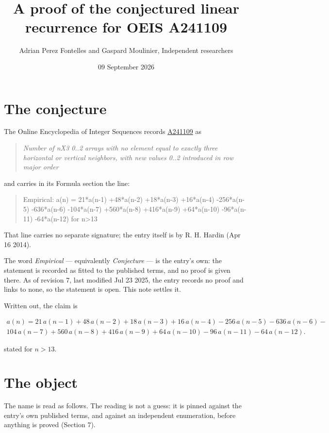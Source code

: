 \documentclass[11pt]{article}
\title{A proof of the conjectured linear recurrence for OEIS A241109}
\author{Adrian Perez Fontelles and Gaspard Moulinier, Independent researchers}
\date{09 September 2026}
\theoremstyle{definition}
\begin{document}
\maketitle
\section{The conjecture}

The Online Encyclopedia of Integer Sequences records \href{https://oeis.org/A241109}{A241109} as

\begin{quote}\itshape Number of nX3 0..2 arrays with no element equal to exactly three horizontal or vertical neighbors, with new values 0..2 introduced in row major order\end{quote}

and carries in its Formula section the line:

\begin{quote}\ttfamily Empirical: a(n) = 21*a(n-1) +48*a(n-2) +18*a(n-3) +16*a(n-4) -256*a(n-5) -636*a(n-6) -104*a(n-7) +560*a(n-8) +416*a(n-9) +64*a(n-10) -96*a(n-11) -64*a(n-12) for n>13\end{quote}

That line carries no separate signature; the entry itself is by R. H. Hardin (Apr 16 2014).

The word {\itshape Empirical} --- equivalently {\itshape Conjecture} --- is the entry's own: the statement is recorded as fitted to the published terms, and no proof is given there. As of revision 7, last modified Jul 23 2025, the entry records no proof and links to none, so the statement is open. This note settles it.

Written out, the claim is

\begin{multline*} a(n) = 21\,a(n-1) + 48\,a(n-2) + 18\,a(n-3) + 16\,a(n-4) - 256\,a(n-5) - 636\,a(n-6) - \\ 104\,a(n-7) + 560\,a(n-8) + 416\,a(n-9) + 64\,a(n-10) - 96\,a(n-11) - 64\,a(n-12). \end{multline*}

stated for $n > 13$.

\section{The object}

The name is read as follows. The reading is not a guess: it is pinned against the entry's own published terms, and against an independent enumeration, before anything is proved (Section 7).
\end{document}
